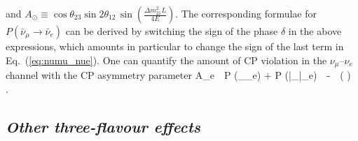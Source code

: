 and $A_\odot \equiv \cos \theta_{23} \sin 2 \theta_{12}\, \sin \left( \frac{\Delta m^2_{21} L}{4 E} \right)$.
%
The corresponding formulae for $P (\bar \nu_\mu \to \bar \nu_e)$ can be derived by
switching the sign of the phase $\delta$ in the above expressions, which amounts
in particular to change the sign of the last term in Eq.~(\ref{eq:numu_nue}).
One can quantify the amount of CP violation in the $\nu_\mu$--$\nu_e$ channel
with the CP asymmetry parameter
%
\be
  A_{\mu e}\, \equiv\, 
    {P (\nu_\mu \to \nu_e) + P (\bar \nu_\mu \to \bar \nu_e)}\ \simeq\,
    -\, \
    \sin \left(  \right) \sin \delta\, .
\eeq
%


\subsection{\it Other three-flavour effects    %
\label{subsec:3-flavour}}                              %

